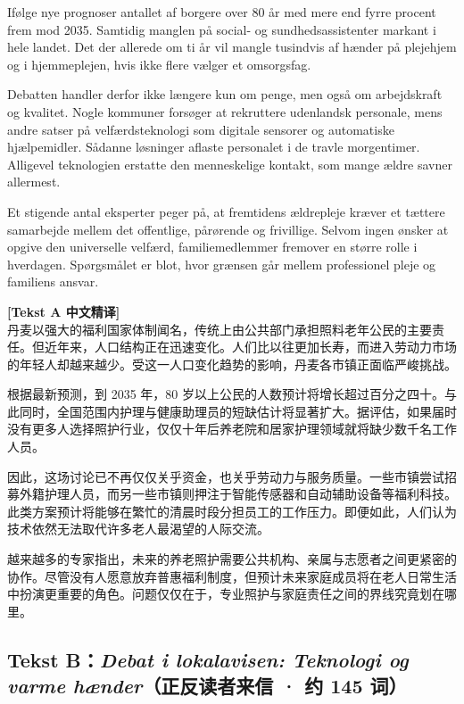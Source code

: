 Ifølge nye prognoser  antallet af borgere over 80 år  med mere end fyrre procent frem mod 2035. Samtidig  manglen på social- og sundhedsassistenter  markant i hele landet. Det  der allerede om ti år vil mangle tusindvis af hænder på plejehjem og i hjemmeplejen, hvis ikke flere vælger et omsorgsfag.

Debatten handler derfor ikke længere kun om penge, men også om arbejdskraft og kvalitet. Nogle kommuner forsøger at rekruttere udenlandsk personale, mens andre satser på velfærdsteknologi som digitale sensorer og automatiske hjælpemidler. Sådanne løsninger  aflaste personalet i de travle morgentimer. Alligevel  teknologien  erstatte den menneskelige kontakt, som mange ældre savner allermest.

Et stigende antal eksperter peger på, at fremtidens ældrepleje kræver et tættere samarbejde mellem det offentlige, pårørende og frivillige. Selvom ingen ønsker at opgive den universelle velfærd,  familiemedlemmer fremover  en større rolle i hverdagen. Spørgsmålet er blot, hvor grænsen går mellem professionel pleje og familiens ansvar.

\begin{transbox}
\small
\textbf{\color{NCDTeal}[Tekst A 中文精译]}\\
丹麦以强大的福利国家体制闻名，传统上由公共部门承担照料老年公民的主要责任。但近年来，人口结构正在迅速变化。人们比以往更加长寿，而进入劳动力市场的年轻人却越来越少。受这一人口变化趋势的影响，丹麦各市镇正面临严峻挑战。

根据最新预测，到 2035 年，80 岁以上公民的人数预计将增长超过百分之四十。与此同时，全国范围内护理与健康助理员的短缺估计将显著扩大。据评估，如果届时没有更多人选择照护行业，仅仅十年后养老院和居家护理领域就将缺少数千名工作人员。

因此，这场讨论已不再仅仅关乎资金，也关乎劳动力与服务质量。一些市镇尝试招募外籍护理人员，而另一些市镇则押注于智能传感器和自动辅助设备等福利科技。此类方案预计将能够在繁忙的清晨时段分担员工的工作压力。即便如此，人们认为技术依然无法取代许多老人最渴望的人际交流。

越来越多的专家指出，未来的养老照护需要公共机构、亲属与志愿者之间更紧密的协作。尽管没有人愿意放弃普惠福利制度，但预计未来家庭成员将在老人日常生活中扮演更重要的角色。问题仅仅在于，专业照护与家庭责任之间的界线究竟划在哪里。
\end{transbox}

\subsection*{Tekst B：\textit{Debat i lokalavisen: Teknologi og varme hænder}（正反读者来信 · 约 145 词）}

